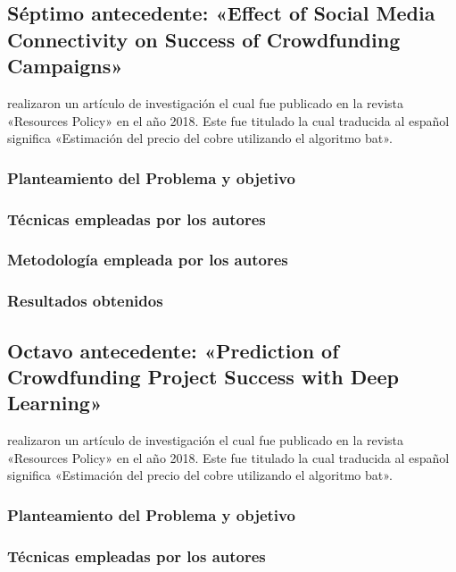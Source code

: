 \subsection{Séptimo antecedente: «Effect of Social Media Connectivity on Success of Crowdfunding Campaigns» \citep*{pr_kaur2017socmedcrowd}}
\citeauthor{pr_kaur2017socmedcrowd} realizaron un artículo de investigación el cual fue publicado en la revista «Resources Policy» en el año 2018. Este fue titulado  la cual traducida al español significa «Estimación del precio del cobre utilizando el algoritmo bat».

\subsubsection{Planteamiento del Problema y objetivo }


\subsubsection{Técnicas empleadas por los autores}
 

\subsubsection{Metodología empleada por los autores}


\subsubsection{Resultados obtenidos}



\subsection{Octavo antecedente: «Prediction of Crowdfunding Project Success with Deep Learning» \citep*{pr_yu2018deeplearning}}
\citeauthor{pr_yu2018deeplearning} realizaron un artículo de investigación el cual fue publicado en la revista «Resources Policy» en el año 2018. Este fue titulado  la cual traducida al español significa «Estimación del precio del cobre utilizando el algoritmo bat».

\subsubsection{Planteamiento del Problema y objetivo }


\subsubsection{Técnicas empleadas por los autores}


